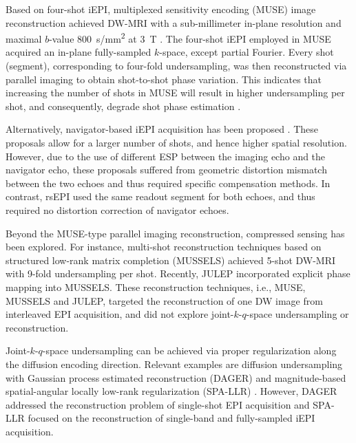 \documentclass[preprint,12pt,authoryear,review]{elsarticle}
\begin{document}
    Based on four-shot iEPI,
    multiplexed sensitivity encoding (MUSE) image reconstruction
    achieved DW-MRI with a sub-millimeter in-plane resolution
    and maximal $b$-value \SI{800}{s/mm^2} at \SI{3}{\tesla}
    \citep{chen_2013_muse}.
    The four-shot iEPI employed in MUSE acquired
    an in-plane fully-sampled $k$-space, except partial Fourier.
    Every shot (segment), corresponding to four-fold undersampling,
    was then reconstructed via parallel imaging
    to obtain shot-to-shot phase variation.
    This indicates that increasing the number of shots in MUSE
    will result in higher undersampling per shot,
    and consequently, degrade shot phase estimation \citep{wu_2017_diff}.

    Alternatively, navigator-based iEPI acquisition has been proposed
    \citep{jeong_2013_navims,dai_2017_navi,dai_2018_navi}.
    These proposals allow for a larger number of shots,
    and hence higher spatial resolution.
    However, due to the use of different ESP
    between the imaging echo and the navigator echo,
    these proposals suffered from geometric distortion mismatch
    between the two echoes and thus required specific compensation methods.
    In contrast, rsEPI \citep{porter_2009_resolve,heidemann_2010_resolve7t}
    used the same readout segment for both echoes,
    and thus required no distortion correction of navigator echoes.

    Beyond the MUSE-type parallel imaging reconstruction,
    compressed sensing \citep{lustig_2007_cs,block_2007_cs}
    has been explored.
    For instance, multi-shot reconstruction techniques
    based on structured low-rank matrix completion (MUSSELS)
    \citep{mani_2017_mussels,bilgic_2019_neatr} achieved
    5-shot DW-MRI with 9-fold undersampling per shot.
    Recently, JULEP \citep{dai_2023_julep}
    incorporated explicit phase mapping into MUSSELS.
    These reconstruction techniques, i.e., MUSE, MUSSELS and JULEP,
    targeted the reconstruction of one DW image
    from interleaved EPI acquisition,
    and did not explore joint-$k$-$q$-space undersampling or reconstruction.

    Joint-$k$-$q$-space undersampling can be achieved
    via proper regularization along the diffusion encoding direction.
    Relevant examples are diffusion undersampling
    with Gaussian process estimated reconstruction (DAGER)
    \citep{wu_2019_dager} and
    magnitude-based spatial-angular locally low-rank regularization
    (SPA-LLR) \citep{hu_2020_spa_llr}.
    However, DAGER addressed the reconstruction problem
    of single-shot EPI acquisition and
    SPA-LLR focused on the reconstruction
    of single-band and fully-sampled iEPI acquisition.
\end{document}

